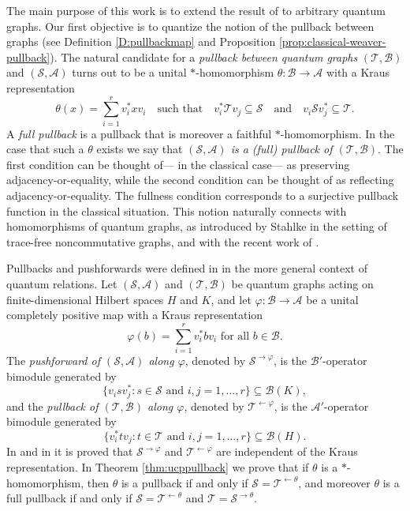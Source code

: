 \documentclass[11pt]{amsart}
\numberwithin{equation}{section}
\theoremstyle{plain}
\theoremstyle{definition}
\theoremstyle{remark}
\newcommand{\A}{{\mathcal{A}}}
\newcommand{\B}{{\mathcal{B}}}
\renewcommand{\S}{{\mathcal{S}}}
\newcommand{\T}{{\mathcal{T}}}
\newcommand\vphi{\varphi}
\newcommand{\foral}{\text{ for all }}
\newcommand{\qand}{\quad\text{and}\quad}
\begin{document}
The main purpose of this work is to  extend the result of \cite{EKT21} to arbitrary quantum graphs.
Our first objective is to quantize the notion of the pullback between graphs (see Definition \ref{D:pullbackmap} and Proposition \ref{prop:classical-weaver-pullback}). The natural candidate for a \emph{pullback between quantum graphs} $(\T,\B)$ and $(\S,\A)$ turns out to be a unital $*$-homomorphism $\theta\colon \B \to \A$ with a Kraus representation  
\[
\theta(x) = \sum_{i=1}^rv_i^*xv_i \quad \text{such that} \quad v_i^*\T v_j \subseteq \S  \qand v_i\S v_j^* \subseteq \T.
\]
A \emph{full pullback} is a pullback that is moreover a faithful $*$-homomorphism. In the case that such a $\theta$ exists we say that \emph{$(\S,\A)$ is a (full) pullback of $(\T,\B)$}.
The first condition can be thought of--- in the classical case--- as preserving adjacency-or-equality, while the second condition can be thought of as reflecting adjacency-or-equality. The fullness condition corresponds to a surjective pullback function in the classical situation. This notion naturally connects with homomorphisms of quantum graphs, as introduced by Stahlke \cite{Sta16} in the setting of trace-free noncommutative graphs, and with the recent work of \cite{KL26}.

Pullbacks and pushforwards were defined in \cite{Wea12} in the more general context of quantum relations.  Let $(\S,\A)$ and $(\T, \B)$ be quantum graphs acting on finite-dimensional Hilbert spaces $H$ and $K$, and let $\vphi\colon \B\to \A$ be a unital completely positive map with a Kraus representation 
\[
\vphi(b) = \sum_{i=1}^rv_i^*bv_i \foral b\in \B.
\]
The \emph{pushforward of $(\S,\A)$ along $\vphi$}, denoted by
$\S^{\rightarrow\vphi}$, is the $\B'$-operator bimodule generated by
\[
\{v_i s v_j^* : s\in\S \text{ and } i,j=1,\dots,r\}
\subseteq \B(K),
\]
and the \emph{pullback of $(\T, \B)$ along $\vphi$}, denoted by
$\T^{\leftarrow\vphi}$, is the $\A'$-operator bimodule generated by 
\[
\{v_i^*t v_j : t\in\T \text{ and } i,j=1,\dots,r \}
\subseteq \B(H).
\]
In \cite{Daws24} and in \cite{Wea12} it is proved that $\S^{\rightarrow\vphi}$ and $\T^{\leftarrow\vphi}$ are independent of the Kraus representation.
In Theorem \ref{thm:ucppullback} we prove that if $\theta$ is a $*$-homomorphism, then $\theta$ is a pullback if and only if $\S=\T^{\leftarrow \theta}$, and moreover $\theta$ is a full pullback if and only if 
$\S=\T^{\leftarrow \theta}$ and $\T=\S^{\rightarrow \theta}$.
\end{document}
